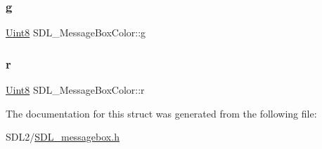 \mbox{\label{struct_s_d_l___message_box_color_a5820adab0b32aa3eade101ea36ed6b4a}} 
\subsubsection{\texorpdfstring{g}{g}}
{\footnotesize\ttfamily \hyperlink{_s_d_l__stdinc_8h_a2944638813a090aa23e62f4da842c3e2}{Uint8} S\+D\+L\+\_\+\+Message\+Box\+Color\+::g}

\mbox{\label{struct_s_d_l___message_box_color_a43ab2172c10058380fcf67ecc3f53184}} 
\subsubsection{\texorpdfstring{r}{r}}
{\footnotesize\ttfamily \hyperlink{_s_d_l__stdinc_8h_a2944638813a090aa23e62f4da842c3e2}{Uint8} S\+D\+L\+\_\+\+Message\+Box\+Color\+::r}



The documentation for this struct was generated from the following file\+:\begin{DoxyCompactItemize}
\item 
S\+D\+L2/\hyperlink{_s_d_l__messagebox_8h}{S\+D\+L\+\_\+messagebox.\+h}\end{DoxyCompactItemize}
